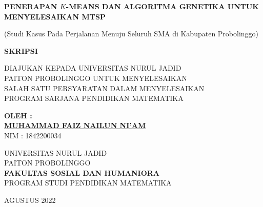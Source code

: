 \begin{center}
\thispagestyle{empty}
\textbf{PENERAPAN $K$-MEANS DAN ALGORITMA GENETIKA UNTUK MENYELESAIKAN MTSP}
       
       (Studi Kasus Pada Perjalanan Menuju Seluruh SMA di Kabupaten Probolinggo) 
       
       \vfill
       \textbf{SKRIPSI}
       \vfill
       
       DIAJUKAN KEPADA UNIVERSITAS NURUL JADID \\
       PAITON PROBOLINGGO UNTUK MENYELESAIKAN \\ SALAH SATU PERSYARATAN DALAM MENYELESAIKAN \\ PROGRAM SARJANA PENDIDIKAN MATEMATIKA
       
       \vfill       
       
       \textbf{OLEH :}\\
       \textbf{\underline{MUHAMMAD FAIZ NAILUN NI'AM}}\\
       NIM : 1842200034

       \vfill
       
       UNIVERSITAS NURUL JADID\\
       PAITON PROBOLINGGO\\
     \textbf{FAKULTAS SOSIAL DAN HUMANIORA}\\       
       PROGRAM STUDI PENDIDIKAN MATEMATIKA\\
       
       \vfill       
       
       AGUSTUS 2022
       
   \end{center}